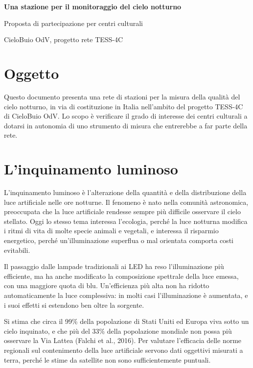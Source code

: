 \documentclass[11pt,a4paper]{report}
\begin{document}
\begin{center}

{\LARGE\bfseries\color{nightblue} Una stazione per il monitoraggio del cielo notturno\par}

\vspace{0.2cm}

{\large Proposta di partecipazione per centri culturali\par}

\vspace{0.1cm}

{\small CieloBuio OdV, progetto rete TESS-4C}

\end{center}

\section*{Oggetto}

Questo documento presenta una rete di stazioni per la misura della qualità del cielo notturno, in via di costituzione in Italia nell'ambito del progetto TESS-4C di CieloBuio OdV. Lo scopo è verificare il grado di interesse dei centri culturali a dotarsi in autonomia di uno strumento di misura che entrerebbe a far parte della rete.

\section*{L'inquinamento luminoso}

L'inquinamento luminoso è l'alterazione della quantità e della distribuzione della luce artificiale nelle ore notturne. Il fenomeno è nato nella comunità astronomica, preoccupata che la luce artificiale rendesse sempre più difficile osservare il cielo stellato. Oggi lo stesso tema interessa l'ecologia, perché la luce notturna modifica i ritmi di vita di molte specie animali e vegetali, e interessa il risparmio energetico, perché un'illuminazione superflua o mal orientata comporta costi evitabili.

Il passaggio dalle lampade tradizionali ai LED ha reso l'illuminazione più efficiente, ma ha anche modificato la composizione spettrale della luce emessa, con una maggiore quota di blu. Un'efficienza più alta non ha ridotto automaticamente la luce complessiva: in molti casi l'illuminazione è aumentata, e i suoi effetti si estendono ben oltre la sorgente.

Si stima che circa il 99\% della popolazione di Stati Uniti ed Europa viva sotto un cielo inquinato, e che più del 33\% della popolazione mondiale non possa più osservare la Via Lattea (Falchi et al., 2016). Per valutare l'efficacia delle norme regionali sul contenimento della luce artificiale servono dati oggettivi misurati a terra, perché le stime da satellite non sono sufficientemente puntuali.
\end{document}
